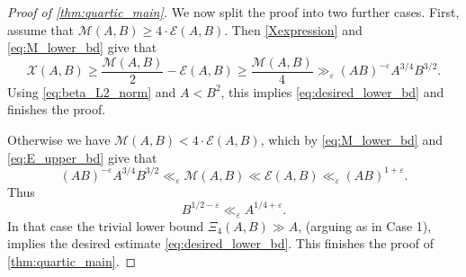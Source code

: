 \documentclass[12pt,reqno]{amsart}
\numberwithin{equation}{section}
\begin{document}
\begin{proof}[Proof of \cref{thm:quartic_main}]
We now split the proof into two further cases. First, assume that $\mathcal{M}(A, B) \geq 4\cdot  \mathcal{E}(A, B)$. Then \eqref{Xexpression} and \eqref{eq:M_lower_bd} give
that
    \begin{equation*}
        \mathcal{X}(A, B) \geq \frac{\mathcal{M}(A, B)}{2} - \mathcal{E}(A, B) \geq \frac{\mathcal{M}(A, B)}{4} \gg_\varepsilon (AB)^{-\varepsilon} A^{3/4} B^{3/2}.
    \end{equation*}
    Using \eqref{eq:beta_L2_norm} and $A < B^2$, this implies \eqref{eq:desired_lower_bd} and finishes the proof.
    
Otherwise we have $\mathcal{M}(A, B) < 4 \cdot \mathcal{E}(A, B)$, which by \eqref{eq:M_lower_bd} and \eqref{eq:E_upper_bd} give
that
    \begin{equation}\label{eq:AB_constraint}
        (AB)^{-\varepsilon} A^{3/4} B^{3/2} \ll_\varepsilon \mathcal{M}(A, B) \ll \mathcal{E}(A, B) \ll_\varepsilon (AB)^{1+\varepsilon}.
    \end{equation}
    Thus
    \begin{equation*}
         B^{1/2 - \varepsilon} \ll_\varepsilon A^{1/4+\varepsilon}.
    \end{equation*}
In that case the trivial lower bound $\Xi_4(A, B) \gg A$, (arguing as in Case 1), implies the desired estimate \eqref{eq:desired_lower_bd}. This finishes the proof of \cref{thm:quartic_main}.
\end{proof}



 
\end{document}
